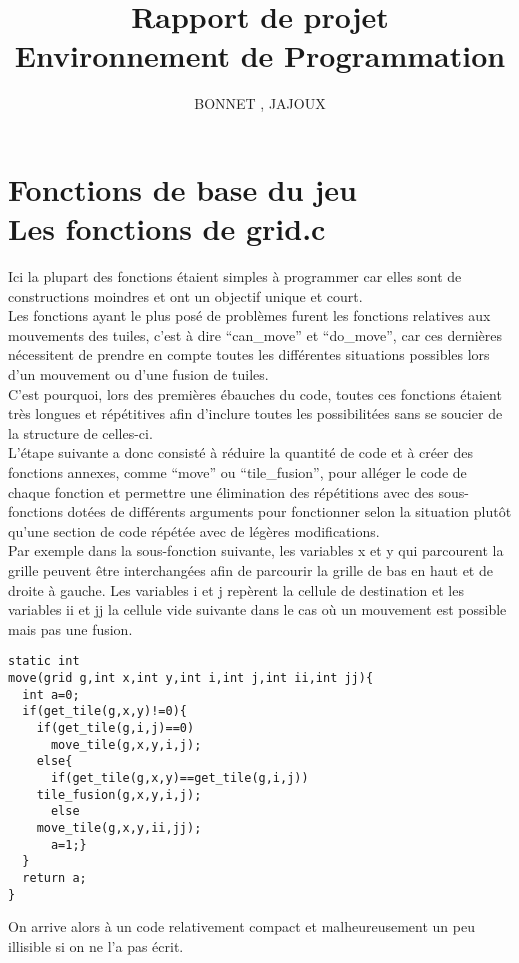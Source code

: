 \documentclass[12pt]{article}
\title{{\bf Rapport de projet} \\ \normalsize{Environnement de Programmation}}
\date{}
\author{\normalsize{BONNET \bsc{Thomas} , JAJOUX \bsc{Jeremy}}}
\begin{document}
\maketitle

\section{Fonctions de base du jeu
\\{\small Les fonctions de grid.c}}

Ici la plupart des fonctions étaient simples à programmer car elles sont de constructions moindres et ont un objectif unique et court.\\

Les fonctions ayant le plus posé de problèmes furent les fonctions relatives aux mouvements des tuiles, c'est à dire ``can\_move'' et ``do\_move'', car ces dernières nécessitent de prendre en compte toutes les différentes situations possibles lors d'un mouvement ou d'une fusion de tuiles.\\

C'est pourquoi, lors des premières ébauches du code, toutes ces fonctions étaient très longues et répétitives afin d'inclure toutes les possibilitées sans se soucier de la structure de celles-ci.\\

L'étape suivante a donc consisté à réduire la quantité de code et à créer des fonctions annexes, comme ``move'' ou ``tile\_fusion'', pour alléger le code de chaque fonction et permettre une élimination des répétitions avec des sous-fonctions dotées de différents arguments pour fonctionner selon la situation plutôt qu'une section de code répétée avec de légères modifications.\\

Par exemple dans la sous-fonction suivante, les variables x  et y qui parcourent la grille peuvent être interchangées afin de parcourir la grille de bas en haut et de droite à gauche. Les variables i et j repèrent la cellule de destination et les variables ii et jj la cellule vide suivante dans le cas où un mouvement est possible mais pas une fusion.\\
\begin{verbatim}
static int
move(grid g,int x,int y,int i,int j,int ii,int jj){
  int a=0;
  if(get_tile(g,x,y)!=0){
    if(get_tile(g,i,j)==0)
      move_tile(g,x,y,i,j);
    else{
      if(get_tile(g,x,y)==get_tile(g,i,j))
	tile_fusion(g,x,y,i,j);
      else
	move_tile(g,x,y,ii,jj);
      a=1;}
  }
  return a;
}
\end{verbatim}
On arrive alors à un code relativement compact et malheureusement un peu illisible si on ne l'a pas écrit.\\
\end{document}
